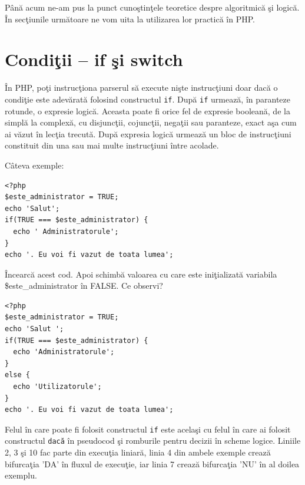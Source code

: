 Până acum ne-am pus la punct cunoştinţele teoretice despre algoritmică şi logică. În secţiunile următoare
ne vom uita la utilizarea lor practică în PHP.



\label{endsec:tipul de date boolean. Expresii logice}

\section{Condiţii -- if şi switch}
În PHP, poţi instrucţiona parserul să execute nişte instrucţiuni doar dacă
o condiţie este adevărată folosind constructul \texttt{if}. După \texttt{if}
urmează, în paranteze rotunde, o expresie logică. Aceasta poate fi orice fel
de expresie booleană, de la simplă la complexă, cu disjuncţii, cojuncţii, negaţii sau
paranteze, exact aşa cum ai văzut în lecţia trecută. După expresia logică urmează un bloc
de instrucţiuni constituit din una sau mai multe instrucţiuni între acolade.

Câteva exemple:
\begin{lstlisting}
<?php
$este_administrator = TRUE;
echo 'Salut';
if(TRUE === $este_administrator) {
  echo ' Administratorule';
}
echo '. Eu voi fi vazut de toata lumea';
\end{lstlisting}
Încearcă acest cod. Apoi schimbă valoarea cu care este iniţializată
variabila \$este\_administrator în FALSE. Ce observi?

\begin{lstlisting}[caption={Utilitatea verificărilor}, label=lst:check_utilisation]
<?php
$este_administrator = TRUE;
echo 'Salut ';
if(TRUE === $este_administrator) {
  echo 'Administratorule';
}
else {
  echo 'Utilizatorule';
}
echo '. Eu voi fi vazut de toata lumea';
\end{lstlisting}

Felul în care poate fi folosit constructul \texttt{if} este acelaşi cu felul în
care ai folosit {\glqq}constructul{\grqq} \texttt{dacă} în pseudocod şi romburile pentru
decizii în scheme logice. Liniile 2, 3 şi 10 fac parte din execuţia liniară,
linia 4 din ambele exemple crează bifurcaţia 'DA' în fluxul de execuţie,
iar linia 7 crează bifurcaţia 'NU' în al doilea exemplu.

